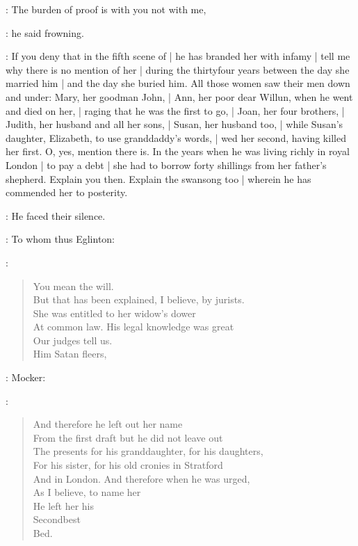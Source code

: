 \Stephen:
The burden of proof is with you not with me,

:
he said frowning.

\Stephen:
If you deny that in the fifth scene of  |
he has branded her with infamy |
tell me why there is no mention of her |
during the thirtyfour years between the day she married him |
and the day she buried him.
All those women saw their men down and under:
Mary, her goodman John, |
Ann, her poor dear Willun, when he went and died on her, |
raging that he was the first to go, |
Joan, her four brothers, |
Judith, her husband and all her sons, |
Susan, her husband too, |
while Susan's daughter,
Elizabeth,
to use granddaddy's words, |
wed her second,
having killed her first.
O, yes,
mention there is.
In the years when he was living richly in royal London |
to pay a debt |
she had to borrow forty shillings from her father's shepherd.
Explain you then.
Explain the swansong too |
wherein he has commended her to posterity.

:
He faced their silence.

:
To whom thus Eglinton:

\eglinton:
\begin{verse}
You mean the will. \\
    But that has been explained, I believe, by jurists. \\
    She was entitled to her widow's dower \\
    At common law. His legal knowledge was great \\
    Our judges tell us. \\
        Him Satan fleers, \\
\end{verse}

:
Mocker:

\Stephen:
\begin{verse}
        And therefore he left out her name \\
    From the first draft but he did not leave out \\
    The presents for his granddaughter, for his daughters, \\
    For his sister, for his old cronies in Stratford \\
    And in London. And therefore when he was urged, \\
    As I believe, to name her \\
    He left her his \\
    Secondbest \\
    Bed.
\end{verse}

